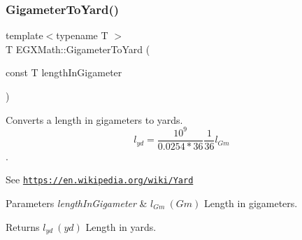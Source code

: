 \subsubsection{\texorpdfstring{Gigameter\+To\+Yard()}{GigameterToYard()}}
{\footnotesize\ttfamily template$<$typename T $>$ \\
T E\+G\+X\+Math\+::\+Gigameter\+To\+Yard (\begin{DoxyParamCaption}\item[{const T}]{length\+In\+Gigameter }\end{DoxyParamCaption})}



Converts a length in gigameters to yards. \[ l_{yd}= \frac{10^{9}}{0.0254 * 36} \frac{1}{36} l_{Gm} \]. 

See \href{https://en.wikipedia.org/wiki/Yard}{\tt https\+://en.\+wikipedia.\+org/wiki/\+Yard} 
\begin{DoxyParams}{Parameters}
{\em length\+In\+Gigameter} & $ l_{Gm}\ (Gm)$ Length in gigameters. \\
\hline
\end{DoxyParams}
\begin{DoxyReturn}{Returns}
$ l_{yd}\ (yd)$ Length in yards. 
\end{DoxyReturn}
